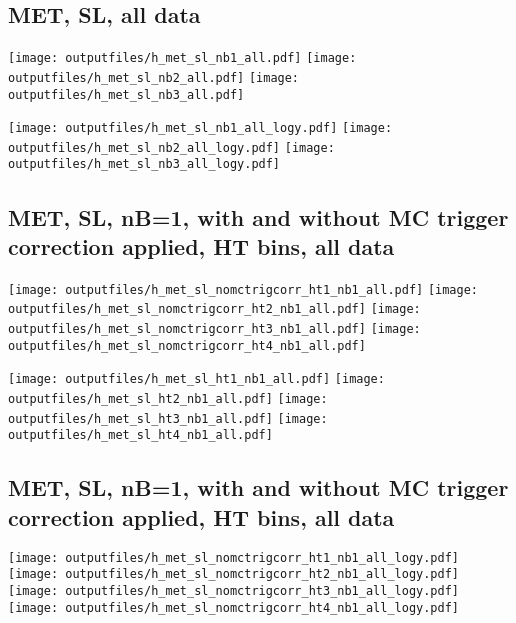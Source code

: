 \documentclass[11pt]{article}
\begin{document}
     \subsection{ MET, SL, all data}

    \noindent
     \texttt{[image: outputfiles/h\_met\_sl\_nb1\_all.pdf]}
     \texttt{[image: outputfiles/h\_met\_sl\_nb2\_all.pdf]}
     \texttt{[image: outputfiles/h\_met\_sl\_nb3\_all.pdf]}

    \noindent
     \texttt{[image: outputfiles/h\_met\_sl\_nb1\_all\_logy.pdf]}
     \texttt{[image: outputfiles/h\_met\_sl\_nb2\_all\_logy.pdf]}
     \texttt{[image: outputfiles/h\_met\_sl\_nb3\_all\_logy.pdf]}


     \subsection{ MET, SL, nB=1, with and without MC trigger correction applied, HT bins, all data}

    \noindent
     \texttt{[image: outputfiles/h\_met\_sl\_nomctrigcorr\_ht1\_nb1\_all.pdf]}
     \texttt{[image: outputfiles/h\_met\_sl\_nomctrigcorr\_ht2\_nb1\_all.pdf]}
     \texttt{[image: outputfiles/h\_met\_sl\_nomctrigcorr\_ht3\_nb1\_all.pdf]}
     \texttt{[image: outputfiles/h\_met\_sl\_nomctrigcorr\_ht4\_nb1\_all.pdf]}

    \noindent
     \texttt{[image: outputfiles/h\_met\_sl\_ht1\_nb1\_all.pdf]}
     \texttt{[image: outputfiles/h\_met\_sl\_ht2\_nb1\_all.pdf]}
     \texttt{[image: outputfiles/h\_met\_sl\_ht3\_nb1\_all.pdf]}
     \texttt{[image: outputfiles/h\_met\_sl\_ht4\_nb1\_all.pdf]}

    \clearpage
     \subsection{ MET, SL, nB=1, with and without MC trigger correction applied, HT bins, all data}

    \noindent
     \texttt{[image: outputfiles/h\_met\_sl\_nomctrigcorr\_ht1\_nb1\_all\_logy.pdf]}
     \texttt{[image: outputfiles/h\_met\_sl\_nomctrigcorr\_ht2\_nb1\_all\_logy.pdf]}
     \texttt{[image: outputfiles/h\_met\_sl\_nomctrigcorr\_ht3\_nb1\_all\_logy.pdf]}
     \texttt{[image: outputfiles/h\_met\_sl\_nomctrigcorr\_ht4\_nb1\_all\_logy.pdf]}
\end{document}

